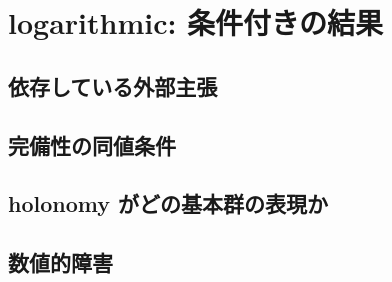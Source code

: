 
\section{logarithmic: 条件付きの結果}

\subsection{依存している外部主張}

\subsection{完備性の同値条件}

\subsection{holonomy がどの基本群の表現か}

\subsection{数値的障害}
